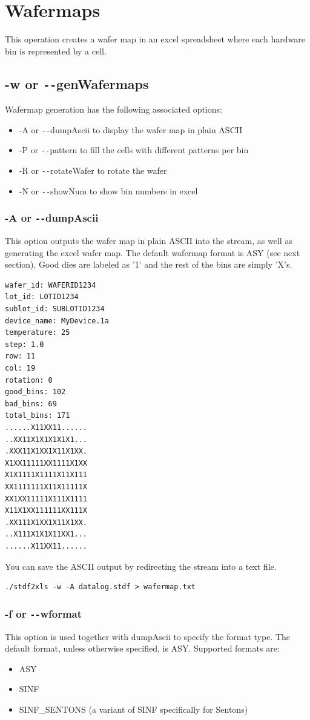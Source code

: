 \documentclass[letterpaper]{article}
\begin{document}
\section{\bf Wafermaps}
This operation creates a wafer map in an excel spreadsheet where each hardware bin is represented by a cell.
\subsection{\bf -w or \texttt{-{}-}genWafermaps}
Wafermap generation has the following associated options:
\begin{itemize}
	\item -A or \texttt{-{}-}dumpAscii to display the wafer map in plain ASCII
	\item -P or \texttt{-{}-}pattern to fill the cells with different patterns per bin
	\item -R or \texttt{-{}-}rotateWafer to rotate the wafer
	\item -N or \texttt{-{}-}showNum to show bin numbers in excel
\end{itemize}
\subsubsection{\bf -A or \texttt{-{}-}dumpAscii}
This option outputs the wafer map in plain ASCII into the stream, as well as generating the excel wafer map. The default wafermap format is ASY (see next section). Good dies are labeled as '1' and the rest of the bins are simply 'X's.
\begin{verbatim}
wafer_id: WAFERID1234
lot_id: LOTID1234
sublot_id: SUBLOTID1234
device_name: MyDevice.1a
temperature: 25
step: 1.0
row: 11
col: 19
rotation: 0
good_bins: 102
bad_bins: 69
total_bins: 171
......X11XX11......
..XX11X1X1X1X1X1...
.XXX11X1XX1X11X1XX.
X1XX11111XX1111X1XX
X1X1111X1111X11X111
XX1111111X11X11111X
XX1XX11111X111X1111
X11X1XX111111XX111X
.XX111X1XX1X11X1XX.
..X111X1X1X11XX1...
......X11XX11......
\end{verbatim}
You can save the ASCII output by redirecting the stream into a text file.
\begin{verbatim}
./stdf2xls -w -A datalog.stdf > wafermap.txt
\end{verbatim}
\subsubsection{\bf -f or \texttt{-{}-}wformat}
This option is used together with dumpAscii to specify the format type. The default format, unless otherwise specified, is ASY. Supported formats are:
\begin{itemize}
	\item ASY
	\item SINF
	\item SINF\_SENTONS (a variant of SINF specifically for Sentons)
\end{itemize}
\end{document}
